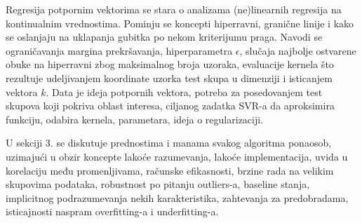 \documentclass[fontsize=12bp, paper=a4]{scrarticle}
\begin{document}
\vbox{}

Regresija potpornim vektorima se stara o analizama (ne)linearnih regresija na kontinualnim vrednostima. Pominju se koncepti hiperravni, granične linije i kako se oslanjaju na uklapanja gubitka po nekom kriterijumu praga. Navodi se ograničavanja margina prekršavanja, hiperparametra $\epsilon$, slučaja najbolje ostvarene obuke na hiperravni zbog maksimalnog broja uzoraka, evaluacije kernela što rezultuje udeljivanjem koordinate uzorka test skupa u dimenziji i isticanjem vektora $k$. Data je ideja potpornih vektora, potreba za posedovanjem test skupova koji pokriva oblast interesa, ciljanog zadatka SVR-a da aproksimira funkciju, odabira kernela, parametara, ideja o regularizaciji.

\vbox{}

U sekciji 3. se diskutuje prednostima i manama svakog algoritma ponaosob, uzimajući u obzir koncepte lakoće razumevanja, lakoće implementacija, uvida u korelaciju među promenljivama, računske efikasnosti, brzine rada na velikim skupovima podataka, robustnost po pitanju outliers-a, baseline stanja, implicitnog podrazumevanja nekih karakteristika, zahtevanja za predobradama, isticajnosti naspram overfitting-a i underfitting-a.

\newpage
\end{document}
